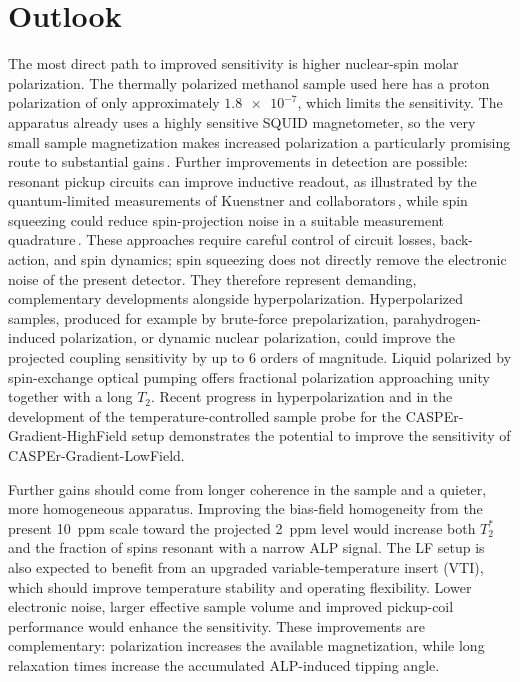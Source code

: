 \section{Outlook}

The most direct path to improved sensitivity is higher nuclear-spin molar polarization.
The thermally polarized methanol sample used here has a proton polarization of only approximately $\num{1.8e-7}$, which limits the sensitivity.
The apparatus already uses a highly sensitive SQUID magnetometer, so the very small sample magnetization makes increased polarization a particularly promising route to substantial gains\,\cite{Walter2025_CASPErLFthermal}.
Further improvements in detection are possible: resonant pickup circuits can improve inductive readout, as illustrated by the quantum-limited measurements of Kuenstner and collaborators\,\cite{Kuenstner2026_QuantumMetrology}, while spin squeezing could reduce spin-projection noise in a suitable measurement quadrature\,\cite{Boyers2025_SpinSqueezing}.
These approaches require careful control of circuit losses, back-action, and spin dynamics; spin squeezing does not directly remove the electronic noise of the present detector.
They therefore represent demanding, complementary developments alongside hyperpolarization.
Hyperpolarized samples, produced for example by brute-force prepolarization, parahydrogen-induced polarization, or dynamic nuclear polarization, could improve the projected coupling sensitivity by up to 6 orders of magnitude.
Liquid  polarized by spin-exchange optical pumping offers fractional polarization approaching unity together with a long $T_2$.
Recent progress in  hyperpolarization and in the development of the temperature-controlled sample probe for the CASPEr-Gradient-HighField setup demonstrates the potential to improve the sensitivity of CASPEr-Gradient-LowField.

Further gains should come from longer coherence in the sample and a quieter, more homogeneous apparatus.
Improving the bias-field homogeneity from the present \SI{10}{ppm} scale toward the projected \SI{2}{ppm} level would increase both $T_2^*$ and the fraction of spins resonant with a narrow ALP signal.
The LF setup is also expected to benefit from an upgraded variable-temperature insert (VTI), which should improve temperature stability and operating flexibility.
Lower electronic noise, larger effective sample volume and improved pickup-coil performance would enhance the sensitivity.
These improvements are complementary: polarization increases the available magnetization, while long relaxation times increase the accumulated ALP-induced tipping angle.


